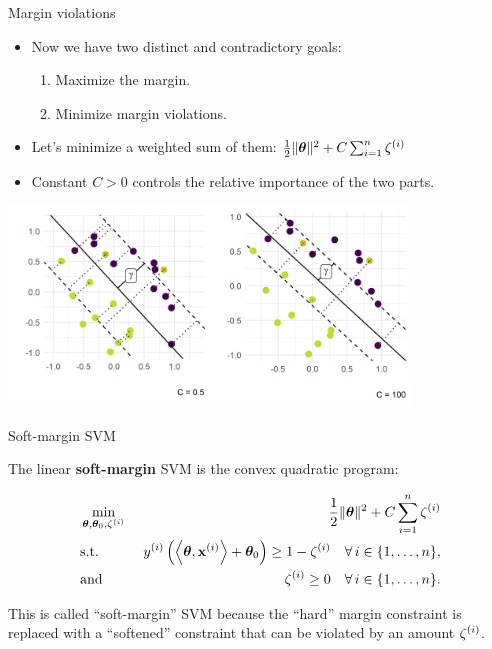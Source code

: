\documentclass[11pt,compress,t,notes=noshow, xcolor=table]{beamer}
\begin{document}
\begin{vbframe}{Margin violations}

  \begin{itemize}
    \item Now we have two distinct and contradictory goals:
    \begin{enumerate}
      \item Maximize the margin.
      \item Minimize margin violations.
    \end{enumerate}
    \item Let's minimize a weighted sum of them: 
    $
    \frac{1}{2} \|\bm{\theta}\|^2 + C   \sum_{i=1}^n \zeta^{(i)}
    $
    \item Constant $C > 0$ controls the relative importance of the two parts.
  \end{itemize}


\begin{center}
\includegraphics[width = 0.8\textwidth ]{figure/margin_violations.png} \\
\end{center}

\end{vbframe}

\begin{vbframe}{Soft-margin SVM}

The linear \textbf{soft-margin} SVM is the convex quadratic program:

  \begin{eqnarray*}
    & \min\limits_{\bm{\theta}, \bm{\theta}_0,\zeta^{(i)}} & \frac{1}{2} \|\bm{\theta}\|^2 + C   \sum_{i=1}^n \zeta^{(i)} \\
    & \text{s.t.} & \,\, y^{(i)}  \left( \left\langle \bm{\theta}, \mathbf{x}^{(i)} \right\rangle + \bm{\theta}_0 \right) \geq 1 - \zeta^{(i)} \quad \forall\, i \in \{1, \ldots, n\},\\
    & \text{and} & \,\, \zeta^{(i)} \geq 0 \quad \forall\, i \in \{1, \ldots, n\}.\\
  \end{eqnarray*}

  This is called \enquote{soft-margin} SVM because the
  \enquote{hard} margin constraint is replaced with a \enquote{softened}
  constraint that can be violated by an amount $\zeta^{(i)}$.\\


\end{vbframe}
\end{document}

